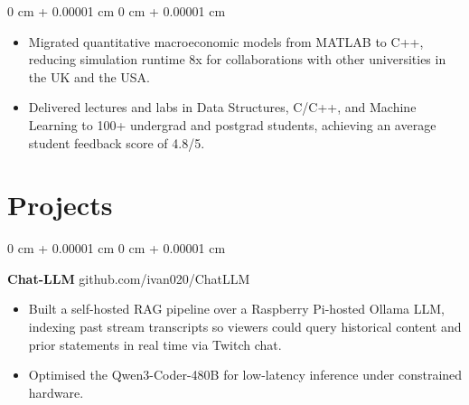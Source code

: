 \documentclass[6pt, letterpaper]{article}
\newenvironment{highlights}{
    \begin{itemize}[
        topsep=0.03 cm,
        parsep=0.03 cm,
        partopsep=0pt,
        itemsep=0pt,
        leftmargin=0 cm + 10pt
    ]
}{
    \end{itemize}
} %
\newenvironment{onecolentry}{
    \begin{adjustwidth}{
        0 cm + 0.00001 cm
    }{
        0 cm + 0.00001 cm
    }
}{
    \end{adjustwidth}
} %
\begin{document}
        \begin{onecolentry}
        \begin{highlights}
        \item Migrated quantitative macroeconomic models from MATLAB to C++, reducing simulation runtime 8x for collaborations with other universities in the UK and the USA.
        \item Delivered lectures and labs in Data Structures, C/C++, and Machine Learning to 100+ undergrad and postgrad students, achieving an average student feedback score of 4.8/5.
        \end{highlights}
        \end{onecolentry}


    \section{Projects}

    \begin{onecolentry}
        \textbf{Chat-LLM} \hfill github.com/ivan020/ChatLLM

        \begin{highlights}

        \item Built a self-hosted RAG pipeline over a Raspberry Pi-hosted Ollama LLM, indexing past stream transcripts so viewers could query historical content and prior statements in real time via Twitch chat. 
        \item Optimised the Qwen3-Coder-480B for low-latency inference under constrained hardware.

        \end{highlights}
    \end{onecolentry}
\end{document}
